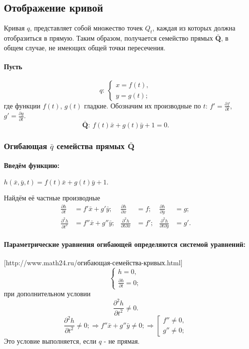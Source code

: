 \subsection{Отображение кривой}
Кривая $q$, представляет собой множество точек $Q_t$, каждая из которых должна отобразиться в прямую. Таким образом, получается семейство прямых $\bar{\mathbf{Q}}$, в общем случае, не имеющих общей точки пересечения.
\paragraph{Пусть}
$$q:\: 
\left\{
\begin{array}{l}
	x = f(t),\\
	y = g(t);
\end{array}
\right.
$$
где функции $f(t)$, $g(t)$ гладкие. Обозначим их производные по $t$: $\displaystyle f' = \frac{\partial f}{\partial t}$, $\displaystyle g' = \frac{\partial g}{\partial t}$.
$$\mathbf{\bar{Q}}:
\:
f(t)\bar{x} + g(t)\bar{y} + 1 = 0.$$
\subsubsection{Огибающая $\bar{q}$ семейства прямых $\mathbf{\bar{Q}}$}
\paragraph{Введём функцию:}
$h(\bar{x}, \bar{y}, t) = f(t)\bar{x} + g(t)\bar{y} + 1.$

Найдём её частные производные
$$
\begin{aligned}
	\frac{\partial h}{\partial t} &= f'\bar{x} + g'\bar{y};
	&
	\frac{\partial h}{\partial\bar{x}} &= f;
	&
	\frac{\partial h}{\partial\bar{y}} &= g;
	\\
	\frac{\partial^2 h}{\partial t^2} &= f''\bar{x} + g''\bar{y};
	&
	\frac{\partial^2 h}{\partial t \partial\bar{x}} &= f';
	&
	\frac{\partial^2 h}{\partial t \partial\bar{y}} &= g'.
\end{aligned}
$$

\paragraph{Параметрические уравнения огибающей определяются системой уравнений:}
[http://www.math24.ru/огибающая-семейства-кривых.html]
$$
\left\{
\begin{gathered}
	h = 0, \\
	\frac{\partial h}{\partial t} = 0;
\end{gathered}
\right.
$$
при дополнительном условии
$$\frac{\partial^2 h}{\partial t^2} \ne 0.$$
$$
\frac{\partial^2 h}{\partial t^2} \ne 0;
\Rightarrow
f''\bar{x} + g''\bar{y} \ne 0;
\Rightarrow
\left[
\begin{gathered}
	f'' \ne 0, \\
	g'' \ne 0;
\end{gathered}
\right.
$$
Это условие выполняется, если $q$ - не прямая.

